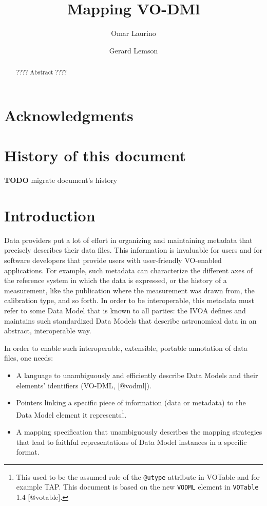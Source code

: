 \documentclass[11pt,a4paper]{ivoa}
\title{Mapping VO-DMl}
\author[????URL????]{Omar Laurino}
\author{Gerard Lemson}
\begin{document}
\begin{abstract}
???? Abstract ????
\end{abstract}


\section*{Acknowledgments}

\section*{History of this document}\label{history-of-this-document}

\textbf{TODO} migrate document's history

\section{Introduction}\label{introduction}

Data providers put a lot of effort in organizing and maintaining
metadata that precisely describes their data files. This information is
invaluable for users and for software developers that provide users with
user-friendly VO-enabled applications. For example, such metadata can
characterize the different axes of the reference system in which the
data is expressed, or the history of a measurement, like the publication
where the measurement was drawn from, the calibration type, and so
forth. In order to be interoperable, this metadata must refer to some
Data Model that is known to all parties: the IVOA defines and maintains
such standardized Data Models that describe astronomical data in an
abstract, interoperable way.

In order to enable such interoperable, extensible, portable annotation
of data files, one needs:

\begin{itemize}
\item
  A language to unambiguously and efficiently describe Data Models and
  their elements' identifiers (VO-DML, {[}@vodml{]}).
\item
  Pointers linking a specific piece of information (data or metadata) to
  the Data Model element it represents\footnote{This used to be the
    assumed role of the \texttt{@utype} attribute in VOTable and for
    example TAP. This document is based on the new \texttt{VODML}
    element in \texttt{VOTable} 1.4 {[}@votable{]}.}.
\item
  A mapping specification that unambiguously describes the mapping
  strategies that lead to faithful representations of Data Model
  instances in a specific format.
\end{itemize}
\end{document}
